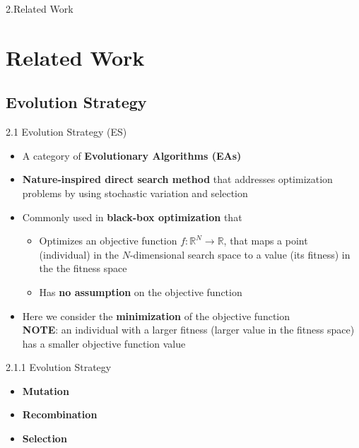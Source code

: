 \documentclass{beamer}
\begin{document}
\begin{frame}[plain,c]
\begin{center}
\Huge 2.Related Work
\end{center}
\end{frame}
\section{Related Work}


\subsection{Evolution Strategy}
\begin{frame}{2.1 Evolution Strategy (ES)}
\begin{itemize}
    \item A category of \textbf{Evolutionary Algorithms (EAs)}
    \item \textbf{Nature-inspired direct search method} that addresses optimization problems by using stochastic variation and selection 
    \item Commonly used in \textbf{black-box optimization} that
    \begin{itemize}
        \item Optimizes an objective function $f:\mathbb{R}^N \rightarrow \mathbb{R}$, that maps a point (individual) in the $N$-dimensional search space to a value (its fitness) in the the fitness space
        \item Has \textbf{no assumption} on the objective function
    \end{itemize}
    \item  Here we consider the \textbf{minimization} of the objective function  \\
    \textbf{NOTE}: an individual with a larger fitness (larger value in the fitness space) has a smaller objective function value

    
\end{itemize}
\end{frame}

\begin{frame}{2.1.1 Evolution Strategy}
\begin{itemize}
    \item \textbf{Mutation}  
    \item \textbf{Recombination}
    
    \item \textbf{Selection} 
\end{itemize}
\end{frame}
\end{document}
